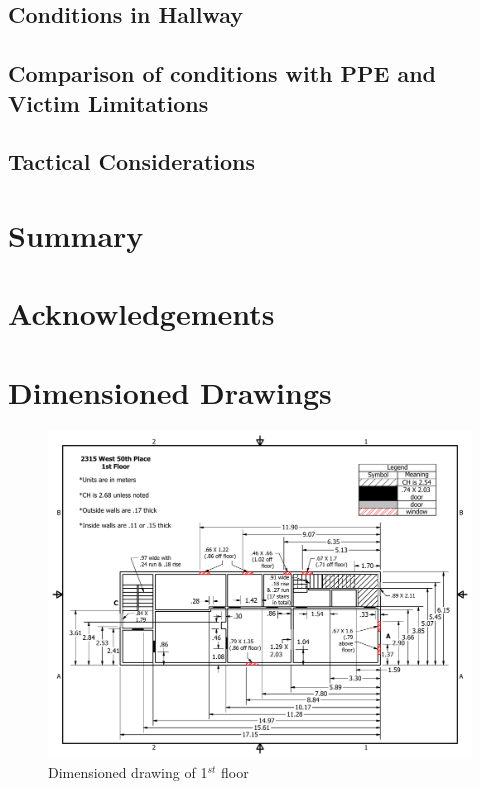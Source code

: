 \documentclass[11pt,oneside]{book}
\begin{document}
\section{Conditions in Hallway}

\section{Comparison of conditions with PPE and Victim Limitations}

\section{Tactical Considerations}

\chapter{Summary}

\chapter{Acknowledgements}



\appendix

\chapter{Dimensioned Drawings}

\begin{figure}[h!]
\centering
\includegraphics[width=.80\textwidth]{../Figures/50th_Place_1st_Floor}
\caption {Dimensioned drawing of 1$^{st}$ floor}
\label{fig:first_floor}
\end{figure}
\end{document}
